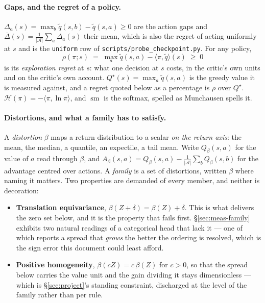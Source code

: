 \documentclass{article}
\newcommand{\actions}{\mathcal{A}}
\newcommand{\h}{\mathcal{H}}
\DeclareMathOperator{\sm}{sm}
\newcommand{\gap}{\Delta}
\newcommand{\gapbar}{\overline{\Delta}}
\newcommand{\ip}[2]{\langle #1, #2 \rangle}
\begin{document}
\paragraph{Gaps, and the regret of a policy.} $\gap_a(s) = \max_b \tilde{q}(s,b) -
\tilde{q}(s,a) \ge 0$ are the action gaps and $\gapbar(s) = \frac{1}{|\actions|}\sum_a \gap_a(s)$
their mean, which is also the regret of acting uniformly at $s$ and is the \texttt{uniform} row
of \texttt{scripts/probe\_checkpoint.py}. For any policy,
\[
  \rho(\pi;s) \;=\; \max_a \tilde{q}(s,a) - \ip{\pi}{\tilde{q}}(s) \;\ge\; 0
\]
is its \emph{exploration regret} at $s$: what one decision at $s$ costs, in the critic's own
units and on the critic's own account. $Q^\star(s) = \max_a \tilde{q}(s,a)$ is the greedy value
it is measured against, and a regret quoted below as a percentage is $\rho$ over $Q^\star$.
$\h(\pi) = -\ip{\pi}{\ln\pi}$, and $\sm$ is the softmax, spelled as Munchausen spells it.

\paragraph{Distortions, and what a family has to satisfy.} A \emph{distortion} $\beta$ maps a
return distribution to a scalar \emph{on the return axis}: the mean, the median, a quantile, an
expectile, a tail mean. Write $Q_\beta(s,a)$ for the value of $a$ read through $\beta$, and
$A_\beta(s,a) = Q_\beta(s,a) - \frac{1}{|\actions|}\sum_b Q_\beta(s,b)$ for the advantage centred
over actions. A \emph{family} is a set of distortions, written $\beta$ where naming it matters.
Two properties are demanded of every member, and neither is decoration:

\begin{itemize}
  \item \textbf{Translation equivariance}, $\beta(Z + \delta) = \beta(Z) + \delta$. This is what
  delivers the zero set below, and it is the property that fails first. \S\ref{sec:meas-family}
  exhibits two natural readings of a categorical head that lack it --- one of which reports a
  spread that \emph{grows} the better the ordering is resolved, which is the sign error this
  document could least afford.
  \item \textbf{Positive homogeneity}, $\beta(cZ) = c\,\beta(Z)$ for $c > 0$, so that the spread
  below carries the value unit and the gain dividing it stays dimensionless --- which is
  \S\ref{sec:project}'s standing constraint, discharged at the level of the family rather than
  per rule.
\end{itemize}
\end{document}
